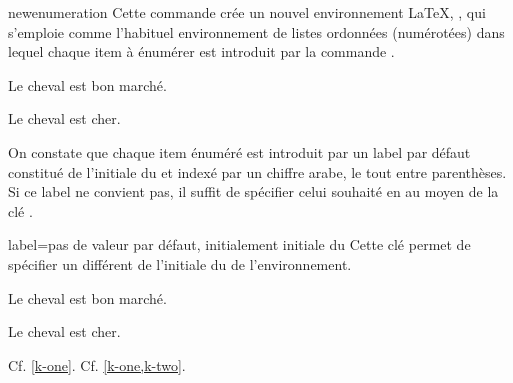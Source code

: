 \documentclass[french,nolocaltoc]{nwejmart}
\newtheorem[style=definition]{fait}
\newtheorem[title=contraventionnalisation]{ctrv}
\newtheorem[title-plural=anneaux]{anneau}
\newtheorem[title-plural=idéaux]{idéal}
\begin{document}
\begin{docCommand}[doc new=2019-03-18]{newenumeration}{}
  Cette commande crée un nouvel environnement \LaTeX{}, , qui
  s'emploie comme l'habituel environnement  de
  listes ordonnées (numérotées) dans lequel chaque item à énumérer
  est introduit par la commande .

\begin{preamblecode}
\end{preamblecode}
\begin{bodycode}
\begin{conventions}
\item Le cheval est bon marché.
\item Le cheval est cher.
\end{conventions}
\end{bodycode}

  On constate que chaque item énuméré est introduit par un label par défaut
  constitué de l'initiale du  et indexé par un chiffre arabe, le tout
  entre parenthèses. Si ce label ne convient pas, il suffit de spécifier celui
  souhaité en  au moyen de la clé .
  \begin{docKey}{label}{={}}{pas de
      valeur par défaut, initialement initiale du }
    Cette clé permet de spécifier un  différent de l'initiale du
     de l'environnement.
  \end{docKey}
\begin{preamblecode}
\end{preamblecode}
\begin{bodycode}[listing and text,listing options={deletekeywords={[2]label}}]
\begin{conventions}
\item\label{k-one} Le cheval est bon marché.
\item\label{k-two} Le cheval est cher.
\end{conventions}
Cf. \vref{k-one}. Cf. \vref{k-one,k-two}.
\end{bodycode}


\end{docCommand}
\end{document}
